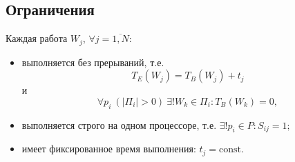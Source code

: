 \documentclass[12pt]{article}
\begin{document}
\subsection*{Ограничения}
Каждая работа $W_j$, $\forall j = \overline{1, N}$:
\begin{itemize}
    \item выполняется без прерываний, т.е.
    \begin{equation}
        T_E(W_j) = T_B(W_j) + t_j
    \end{equation}
    и
    \begin{equation}
        \forall p_i~(|\Pi_i| > 0)~\exists! W_k \in \Pi_i: T_B(W_k) = 0,
    \end{equation}

    \item выполняется строго на одном процессоре, т.е.
    $\exists! p_i \in P: S_{ij} = 1;$

    \item имеет фиксированное время выполнения: $t_j = \text{const}$.
\end{itemize}
\end{document}
